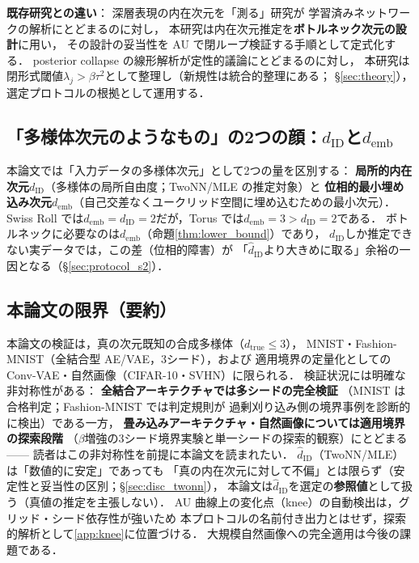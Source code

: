 \documentclass[11pt,a4paper]{jsarticle}
\newcommand{\dID}{d_{\mathrm{ID}}}
\newcommand{\hatdID}{\hat{d}_{\mathrm{ID}}}
\newcommand{\dtrue}{d_{\mathrm{true}}}
\newcommand{\demb}{d_{\mathrm{emb}}}
\begin{document}
\textbf{既存研究との違い}：
深層表現の内在次元を「測る」研究\cite{ansuini2019intrinsic,pope2021intrinsic,valeriani2023geometry}が
学習済みネットワークの解析にとどまるのに対し，
本研究は内在次元推定を\textbf{ボトルネック次元の設計}に用い，
その設計の妥当性を AU で閉ループ検証する手順として定式化する．
posterior collapse の線形解析\cite{lucas2019elbo}が定性的議論にとどまるのに対し，
本研究は閉形式閾値$\lambda_j > \beta\tau^2$として整理し（新規性は統合的整理にある；
§\ref{sec:theory}），選定プロトコルの根拠として運用する．

\subsection{「多様体次元のようなもの」の2つの顔：$\dID$と$\demb$}\label{sec:intro_dim}

本論文では「入力データの多様体次元」として2つの量を区別する：
\textbf{局所的内在次元}$\dID$（多様体の局所自由度；TwoNN/MLE の推定対象）と
\textbf{位相的最小埋め込み次元}$\demb$（自己交差なくユークリッド空間に埋め込むための最小次元）．
Swiss Roll では$\demb = \dID = 2$だが，Torus では$\demb = 3 > \dID = 2$である．
ボトルネックに必要なのは$\demb$（命題\ref{thm:lower_bound}）であり，
$\dID$しか推定できない実データでは，この差（位相的障害）が
「$\hatdID$より大きめに取る」余裕の一因となる（§\ref{sec:protocol_s2}）．

\subsection{本論文の限界（要約）}\label{sec:intro_limits}

本論文の検証は，真の次元既知の合成多様体（$\dtrue \leq 3$），
MNIST・Fashion-MNIST（全結合型 AE/VAE，3シード），および
適用境界の定量化としての Conv-VAE・自然画像（CIFAR-10・SVHN）に限られる．
検証状況には明確な非対称性がある：
\textbf{全結合アーキテクチャでは多シードの完全検証}
（MNIST は合格判定；Fashion-MNIST では判定規則が
過剰刈り込み側の境界事例を診断的に検出）である一方，
\textbf{畳み込みアーキテクチャ・自然画像については適用境界の探索段階}
（$\beta$増強の3シード境界実験と単一シードの探索的観察）にとどまる——
読者はこの非対称性を前提に本論文を読まれたい．
$\hatdID$（TwoNN/MLE）は「数値的に安定」であっても
「真の内在次元に対して不偏」とは限らず（安定性と妥当性の区別；§\ref{sec:disc_twonn}），
本論文は$\hatdID$を選定の\textbf{参照値}として扱う（真値の推定を主張しない）．
AU 曲線上の変化点（knee）の自動検出は，グリッド・シード依存性が強いため
本プロトコルの名前付き出力とはせず，探索的解析として\ref{app:knee}に位置づける．
大規模自然画像への完全適用は今後の課題である．
\end{document}
